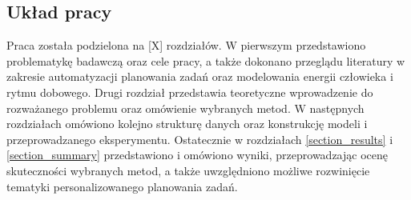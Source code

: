 \subsection{Układ pracy}\label{section_layout}
\quad Praca została podzielona na [X] rozdziałów.  W pierwszym przedstawiono problematykę badawczą oraz cele pracy, a także dokonano przeglądu literatury w zakresie automatyzacji planowania zadań oraz modelowania energii człowieka i rytmu dobowego. Drugi rozdział przedstawia teoretyczne wprowadzenie do rozważanego problemu oraz omówienie wybranych metod. W następnych rozdziałach omówiono kolejno strukturę danych oraz konstrukcję modeli i przeprowadzanego eksperymentu. Ostatecznie w rozdziałach \ref{section_results} i \ref{section_summary} przedstawiono i omówiono wyniki, przeprowadzając ocenę skuteczności wybranych metod, a także uwzględniono możliwe rozwinięcie tematyki personalizowanego planowania zadań. 
